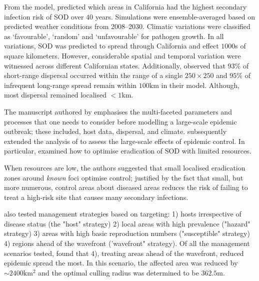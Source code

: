 From the model, \cite{meentemeyer2011epidemiological} predicted which areas in California
had the highest secondary infection risk of SOD over $40$ years.
Simulations were ensemble-averaged based on predicted weather conditions from 2008–2030.
Climatic variations were classified as `favourable', `random' and `unfavourable' for
pathogen growth.
In all variations, SOD was predicted to spread through California and effect $1000$s
of square kilometers. However, considerable spatial and temporal variation were witnessed
across different Californian states. Additionally, \cite{meentemeyer2011epidemiological} 
observed that $93\%$ of short-range dispersal occurred within the range of a single $\mathrm{250 \times 250}$ and 
$95\%$ of infrequent long-range spread remain within $100\mathrm{km}$ in their model.
Although, most dispersal remained localised $<1\mathrm{km}$.

The manuscript authored by \cite{meentemeyer2011epidemiological} emphasises the multi-faceted 
parameters and processes that one needs to consider before modelling a large-scale epidemic
outbreak; these included, host data, dispersal, and climate.
\cite{large-scale-control} subsequently extended the analysis of \cite{meentemeyer2011epidemiological}
to assess the large-scale effects of epidemic control. 
In particular, \cite{large-scale-control} examined how to optimise eradication of SOD with 
limited resources. 

When resources are low, the authors suggested that small localised 
eradication zones around \textit{known} foci optimise control; justified by the fact that
small, but more numerous, control areas about diseased areas reduces the risk of failing 
to treat a high-risk site that causes many secondary infections. 

\cite{large-scale-control} also tested management strategies based on targeting:
1) hosts irrespective of disease 
status (the "host" strategy)
2) local areas with high prevalence ("hazard" strategy)
3) areas with high basic reproduction numbers ("susceptible" strategy)
4) regions ahead of the wavefront ('wavefront" strategy).
Of all the management scenarios tested, \cite{large-scale-control} found
that 4), treating areas ahead of the wavefront, reduced epidemic spread the most.
In this scenario, the affected area was reduced by $\sim 2400\mathrm{km^2}$ and 
the optimal culling radius was determined to be $362.5\mathrm{m}$.

